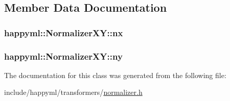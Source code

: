 \subsection{Member Data Documentation}
\subsubsection[{\texorpdfstring{nx}{nx}}]{ happyml\+::\+Normalizer\+X\+Y\+::nx\hspace{0.3cm}{\ttfamily [protected]}}\hypertarget{classhappyml_1_1NormalizerXY_aedf3f87518e5e04fc2ec66aaa99e358a}{}\label{classhappyml_1_1NormalizerXY_aedf3f87518e5e04fc2ec66aaa99e358a}
\subsubsection[{\texorpdfstring{ny}{ny}}]{ happyml\+::\+Normalizer\+X\+Y\+::ny\hspace{0.3cm}{\ttfamily [protected]}}\hypertarget{classhappyml_1_1NormalizerXY_a0f544e4bc2461e124cae233125c2a52e}{}\label{classhappyml_1_1NormalizerXY_a0f544e4bc2461e124cae233125c2a52e}


The documentation for this class was generated from the following file\+:\begin{DoxyCompactItemize}
\item 
include/happyml/transformers/\hyperlink{normalizer_8h}{normalizer.\+h}\end{DoxyCompactItemize}

